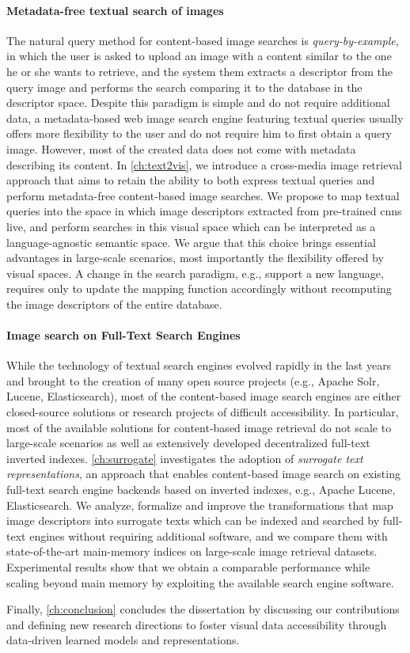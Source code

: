 \paragraph{Metadata-free textual search of images}
The natural query method for content-based image searches is \emph{query-by-example}, in which the user is asked to upload an image with a content similar to the one he or she wants to retrieve, and the system them extracts a descriptor from the query image and performs the search comparing it to the database in the descriptor space.
Despite this paradigm is simple and do not require additional data, a metadata-based web image search engine featuring textual queries usually offers more flexibility to the user and do not require him to first obtain a query image.
However, most of the created data does not come with metadata describing its content.
In \ref{ch:text2vis}, we introduce a cross-media image retrieval approach that aims to retain the ability to both express textual queries and perform metadata-free content-based image searches.
We propose to map textual queries into the space in which image descriptors extracted from pre-trained \glspl{cnn} live, and perform searches in this visual space which can be interpreted as a language-agnostic semantic space.
We argue that this choice brings essential advantages in large-scale scenarios, most importantly the flexibility offered by visual spaces.
A change in the search paradigm, e.g., support a new language, requires only to update the mapping function accordingly without recomputing the image descriptors of the entire database.

\paragraph{Image search on Full-Text Search Engines}
While the technology of textual search engines evolved rapidly in the last years and brought to the creation of many open source projects (e.g., Apache Solr, Lucene, Elasticsearch), most of the content-based image search engines are either closed-source solutions or research projects of difficult accessibility.
In particular, most of the available solutions for content-based image retrieval do not scale to large-scale scenarios as well as extensively developed decentralized full-text inverted indexes.
\ref{ch:surrogate} investigates the adoption of \emph{surrogate text representations}, an approach that enables content-based image search on existing full-text search engine backends based on inverted indexes, e.g., Apache Lucene, Elasticsearch.
We analyze, formalize and improve the transformations that map image descriptors into surrogate texts which can be indexed and searched by full-text engines without requiring additional software, and we compare them with state-of-the-art main-memory indices on large-scale image retrieval datasets.
Experimental results show that we obtain a comparable performance while scaling beyond main memory by exploiting the available search engine software.

Finally, \ref{ch:conclusion} concludes the dissertation by discussing our contributions and defining new research directions to foster visual data accessibility through data-driven learned models and representations.
